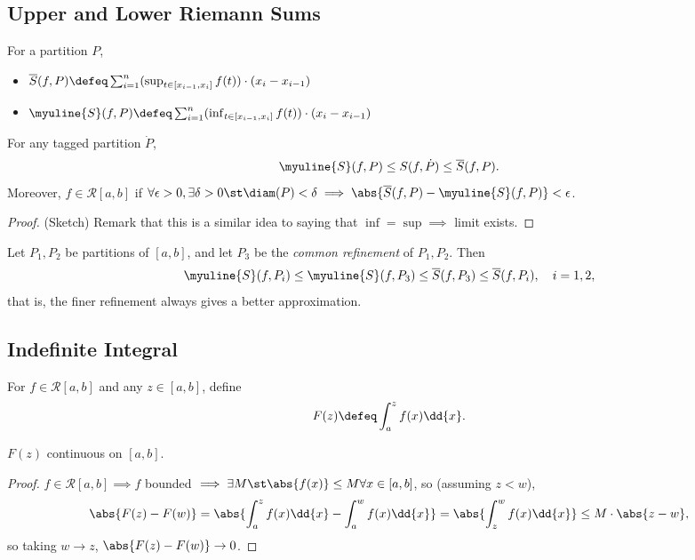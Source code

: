 \subsection{Upper and Lower Riemann Sums}

\begin{definition}
    For a partition $P$, \begin{itemize}
        \item $\overline{S}(f, P) \defeq \sum_{i=1}^n (\sup_{t \in [x_{i-1}, x_i]} f(t))\cdot (x_i - x_{i-1})$
        \item  $\myuline{S}(f, P) \defeq \sum_{i=1}^n (\inf_{t \in [x_{i-1}, x_i]} f(t))\cdot (x_i - x_{i-1})$
    \end{itemize}
\end{definition}

\begin{proposition}
    For any tagged partition $\dot{P}$, \[
    \myuline{S}(f, P) \leq S(f, \dot{P}) \leq \overline{S}(f, P).
    \]
    Moreover, $f \in \mathcal{R}[a, b]$ if $\forall \epsilon > 0, \exists \delta > 0 \st \diam(P) < \delta \implies \abs{\overline{S}(f, P) - \myuline{S}(f, P)} < \epsilon$.
\end{proposition}

\begin{proof}(Sketch)
    Remark that this is a similar idea to saying that $\inf = \sup \implies $ limit exists.
\end{proof}

\begin{proposition}
    Let $P_1, P_2$ be partitions of $[a, b]$, and let $P_3$ be the \emph{common refinement} of $P_1, P_2$. Then \[
        \myuline{S}(f, P_i) \leq \myuline{S}(f, P_3) \leq \overline{S}(f, P_3) \leq \overline{S}(f, P_i), \quad i = 1, 2,
    \]
    that is, the finer refinement always gives a better approximation.
\end{proposition}

\subsection{Indefinite Integral}

\begin{definition}
    For $f \in \mathcal{R}[a, b]$ and any $z \in [a, b]$, define \[
    F(z) \defeq \int_a^z f(x) \dd{x}.    
    \]
\end{definition}

\begin{theorem}
   $ F(z)$ continuous on $[a, b]$.
\end{theorem}
\begin{proof}
    $f \in \mathcal{R}[a, b] \implies f$ bounded $\implies \exists M \st \abs{f(x)} \leq M \forall x \in [a, b]$, so (assuming $z < w$), \[
    \abs{F(z) - F(w)} = \abs{\int_a^z f(x) \dd{x} - \int_a^w f(x) \dd{x}}    = \abs{\int_z^w f(x) \dd{x}} \leq M \cdot \abs{z - w},
    \]
    so taking $w \to z$, $\abs{F(z) - F(w)} \to 0$.
\end{proof}

